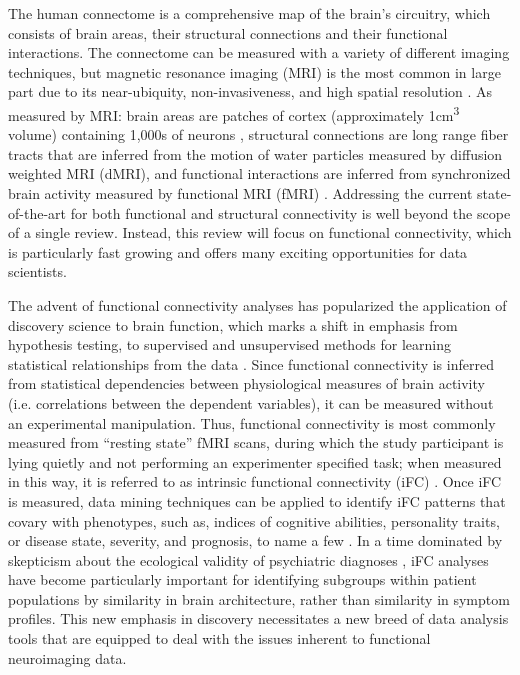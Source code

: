 \documentclass{bmcart}
\begin{document}
The human connectome is a comprehensive map of the brain's circuitry, which consists of brain areas, their structural connections and their functional interactions. The connectome can be measured with a variety of different imaging techniques, but magnetic resonance imaging (MRI) is the most common in large part due to its near-ubiquity, non-invasiveness, and high spatial resolution \cite{Craddock2013}. As measured by MRI: brain areas are patches of cortex (approximately 1\si{\centi\meter\cubed} volume) containing 1,000s of neurons \cite{Varela2001}, structural connections are long range fiber tracts that are inferred from the motion of water particles measured by diffusion weighted MRI (dMRI), and functional interactions are inferred from synchronized brain activity measured by functional MRI (fMRI) \cite{Behrens2012}. Addressing the current state-of-the-art for both functional and structural connectivity is well beyond the scope of a single review. Instead, this review will focus on functional connectivity, which is particularly fast growing and offers many exciting opportunities for data scientists.

The advent of functional connectivity analyses has popularized the application of discovery science to brain function, which marks a shift in emphasis from hypothesis testing, to supervised and unsupervised methods for learning statistical relationships from the data \cite{Biswal2010}. Since functional connectivity is inferred from statistical dependencies between physiological measures of brain activity (i.e. correlations between the dependent variables), it can be measured without an experimental manipulation. Thus, functional connectivity is most commonly measured from ``resting state'' fMRI scans, during which the study participant is lying quietly and not performing an experimenter specified task; when measured in this way, it is referred to as intrinsic functional connectivity (iFC) \cite{Biswal1995}. Once iFC is measured, data mining techniques can be applied to identify iFC patterns that covary with phenotypes, such as, indices of cognitive abilities, personality traits, or disease state, severity, and prognosis, to name a few \cite{Varoquaux2013}. In a time dominated by skepticism about the ecological validity of psychiatric diagnoses \cite{Kapur2012}, iFC analyses have become particularly important for identifying subgroups within patient populations by similarity in brain architecture, rather than similarity in symptom profiles. This new emphasis in discovery necessitates a new breed of data analysis tools that are equipped to deal with the issues inherent to functional neuroimaging data.
\end{document}
